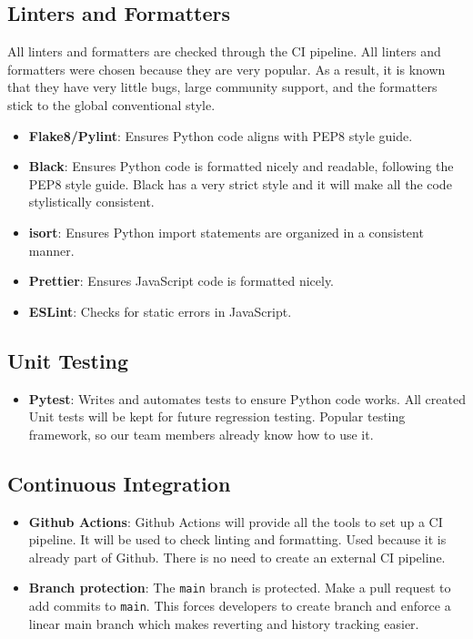 \documentclass{article}
\begin{document}
\subsection{Linters and Formatters}
All linters and formatters are checked through the CI pipeline. All linters and formatters were
chosen because they are very popular. As a result, it is known that they have very little bugs, 
large community support, and the formatters stick to the global conventional style.
\begin{itemize}
  \item \textbf{Flake8/Pylint}: Ensures Python code aligns with PEP8 style guide.
  \item \textbf{Black}: Ensures Python code is formatted nicely and readable, following the PEP8
    style guide. Black has a very strict style and it will make all the code stylistically 
    consistent.
  \item \textbf{isort}: Ensures Python import statements are organized in a consistent manner.
  \item \textbf{Prettier}: Ensures JavaScript code is formatted nicely.
  \item \textbf{ESLint}: Checks for static errors in JavaScript.
\end{itemize}

\subsection{Unit Testing}
\begin{itemize}
  \item \textbf{Pytest}: Writes and automates tests to ensure Python code works. All created Unit 
  tests will be kept for future regression testing. Popular testing framework, so our team members
  already know how to use it.
\end{itemize}

\subsection{Continuous Integration}
\begin{itemize}
  \item \textbf{Github Actions}: Github Actions will provide all the tools to set up a CI pipeline.
    It will be used to check linting and formatting. Used because it is already part of Github.
    There is no need to create an external CI pipeline.
  \item \textbf{Branch protection}: The \verb|main| branch is protected. Make a pull request to
    add commits to \verb|main|. This forces developers to create branch and enforce a linear main 
    branch which makes reverting and history tracking easier.
\end{itemize}
\end{document}
